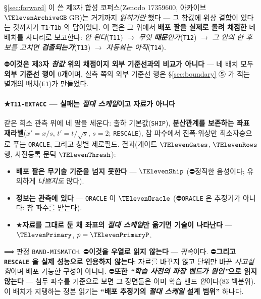 \documentclass[11pt]{report}
\numberwithin{equation}{chapter}
\numberwithin{figure}{chapter}
\numberwithin{table}{chapter}
\begin{document}
\S\ref{sec:forward} 이 쓴 제3자 합성 코퍼스(Zenodo 17359600, 아카이브
$\TElevenArchiveGB$\,GB)는 거기까지 \emph{읽히기만} 했다 --- 그 참값에 위상 결합이
있다는 것까지가 \texttt{T1}$\cdot$\texttt{T1b} 의 답이었다. 이 절은 그 위에서
\textbf{배포 팔을 실제로 돌려 채점한} 네 배치를 사다리로 보고한다:
\emph{안 된다}(\texttt{T11}) $\to$ \emph{무엇 \textbf{때문}인가}(\texttt{T12}) $\to$
\emph{그 안의 한 후보를 고치면 \textbf{검출되는가}}(\texttt{T13}) $\to$
\emph{자동화는 아직}(\texttt{T14}).

⛔\textbf{이것은 제3자 \emph{참값} 위의 채점이지 외부 기준선과의 비교가 아니다} ---
네 배치 모두 \textbf{외부 기준선 행이 $0$개}이며, 실측 쪽의 외부 기준선 행은
\S\ref{sec:boundary} ⑤ 가 적는 별개의 배치(\texttt{E1})가 만들었다.

\paragraph{★\texttt{T11-EXTACC} --- 실패는 \emph{절대 스케일}이고 자료가 아니다}
같은 희소 관측 위에 네 팔을 세운다: 출하 기본값(\texttt{SHIP}), \textbf{분산관계를
보존하는 좌표 재라벨}($x' = x/s$, $t' = t/\sqrt{s}$, $s = 2$; \texttt{RESCALE}),
참 파수에서 진폭$\cdot$위상만 최소자승으로 푸는 \texttt{ORACLE}, 그리고 창별 제로필드.
결과(게이트 $\TElevenGates$, $\TElevenRows$ 행, 사전등록 문턱 $\TElevenThresh$):
\begin{itemize}
  \item \textbf{배포 팔은 무기술 기준을 넘지 못한다} --- $\TElevenShip$
        (⛔정직한 음성이다; 유의하게 \emph{나쁘지도} 않다).
  \item \textbf{정보는 관측에 있다} --- \texttt{ORACLE} 이 $\TElevenOracle$
        (⛔\texttt{ORACLE} 은 추정기가 아니다: 참 파수를 받는다).
  \item ★\textbf{자료를 그대로 둔 채 좌표의 \emph{절대 스케일}만 옮기면 기술이 나타난다} ---
        $\TElevenPrimary$, $p = \TElevenPrimaryP$.
\end{itemize}
⟹ 판정 \texttt{BAND-MISMATCH}. ⛔\textbf{이것을 우열로 읽지 않는다} --- \emph{귀속}이다.
⛔\textbf{그리고 \texttt{RESCALE} 을 실제 성능으로 인용하지 않는다}: 자료를 바꾸지 않고
단위만 바꾼 \emph{사고실험}이며 배포 가능한 구성이 아니다.
⛔\textbf{또한 \emph{``학습 사전의 파장 밴드가 원인''}으로 읽지 않는다} --- 첨두 파수를
기준으로 보면 그 장면들은 이미 학습 밴드 \emph{안}이다($83$ 백분위). 이 배치가 지탱하는
정본 읽기는 \textbf{``배포 추정기의 \emph{절대 스케일} 설계 범위''} 하나다.
\end{document}
